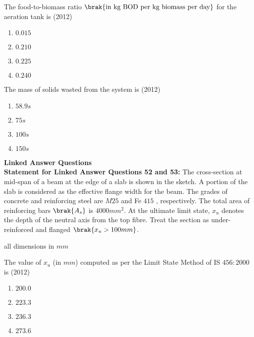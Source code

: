 	\item  The food-to-biomass  ratio $\brak{\text{in kg BOD per kg biomass per day}}$ for the aeration tank is
	\hfill{(2012)}
		\begin{enumerate}
			\item $0.015$
			\item $0.210$
			\item $0.225$
			\item $0.240$
        	\end{enumerate}	
	\item The mass  of solids wasted from the system is
	\hfill{(2012)}
		\begin{enumerate}
			\item $58.9 s$
			\item $75 s$
			\item $100 s$
			\item $150 s$
        	\end{enumerate}	
\textbf{Linked Answer Questions}\\
\textbf{Statement for Linked Answer Questions 52 and 53:}
	The cross-section at mid-span of a beam at the edge of a slab is shown in the sketch. A portion of the slab is considered as the effective flange width for the beam. The grades of concrete and reinforcing steel are $M25$ and Fe $415$ , respectively. The total area of reinforcing bars $\brak{A_{s}}$ is $4000 mm^{2}$. At the ultimate limit state, $x_{u}$ denotes the depth of the neutral axis from the top fibre. Treat the section as under-reinforced and flanged $\brak{x_{u}>100 mm}$.


 all dimensions in $mm$
       \item The value of $x_{u}$ (in $mm$) computed as per the Limit State Method of IS $456:2000$ is
       \hfill{(2012)}
		\begin{enumerate}
			\item $200.0$
			\item $223.3$
			\item $236.3$
			\item $273.6$
        	\end{enumerate}	

